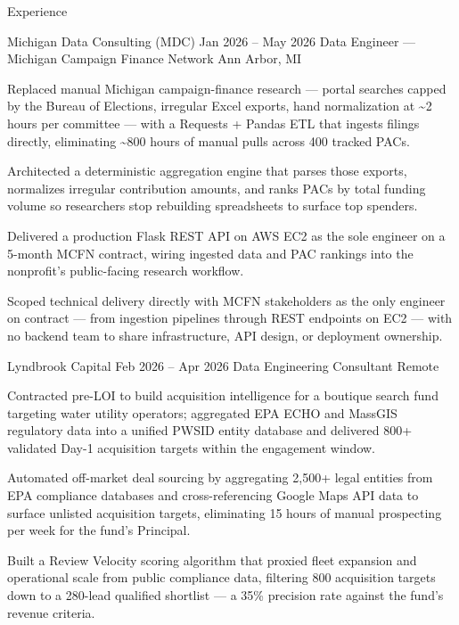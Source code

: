 \documentclass[
	11pt
]{../template}
\begin{document}

	\begin{rSection}{E}{xperience}
		\begin{rSectionEntry}
			{Michigan Data Consulting (MDC)}
			{Jan 2026 -- May 2026}
			{Data Engineer --- Michigan Campaign Finance Network}
			{}
			{Ann Arbor, MI}

			\item Replaced manual Michigan campaign-finance research --- portal searches capped by the Bureau of Elections, irregular Excel exports, hand normalization at \textasciitilde2 hours per committee --- with a Requests + Pandas ETL that ingests filings directly, eliminating \textasciitilde800 hours of manual pulls across 400 tracked PACs.
			\item Architected a deterministic aggregation engine that parses those exports, normalizes irregular contribution amounts, and ranks PACs by total funding volume so researchers stop rebuilding spreadsheets to surface top spenders.
			\item Delivered a production Flask REST API on AWS EC2 as the sole engineer on a 5-month MCFN contract, wiring ingested data and PAC rankings into the nonprofit's public-facing research workflow.
			\item Scoped technical delivery directly with MCFN stakeholders as the only engineer on contract --- from ingestion pipelines through REST endpoints on EC2 --- with no backend team to share infrastructure, API design, or deployment ownership.
		\end{rSectionEntry}

		\begin{rSectionEntry}
			{Lyndbrook Capital}
			{Feb 2026 -- Apr 2026}
			{Data Engineering Consultant}
			{}
			{Remote}

			\item Contracted pre-LOI to build acquisition intelligence for a boutique search fund targeting water utility operators; aggregated EPA ECHO and MassGIS regulatory data into a unified PWSID entity database and delivered 800+ validated Day-1 acquisition targets within the engagement window.
			\item Automated off-market deal sourcing by aggregating 2,500+ legal entities from EPA compliance databases and cross-referencing Google Maps API data to surface unlisted acquisition targets, eliminating 15 hours of manual prospecting per week for the fund's Principal.
			\item Built a Review Velocity scoring algorithm that proxied fleet expansion and operational scale from public compliance data, filtering 800 acquisition targets down to a 280-lead qualified shortlist --- a 35\% precision rate against the fund's revenue criteria.
		\end{rSectionEntry}


\end{rSection}
\end{document}
